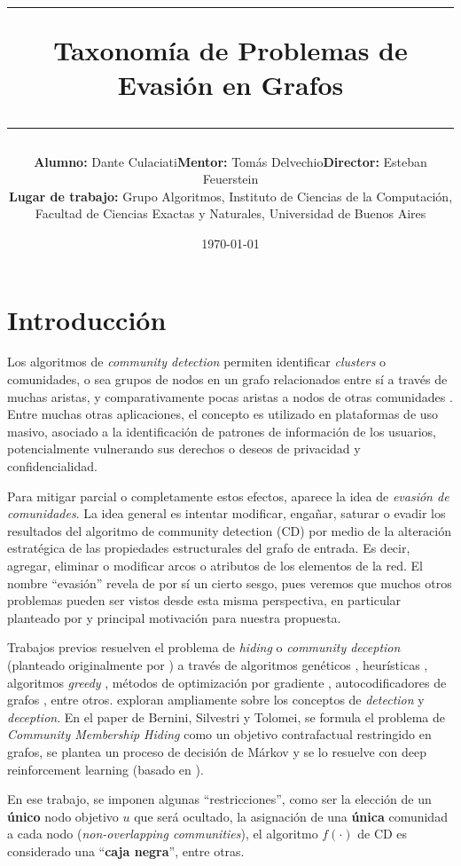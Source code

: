 \documentclass[11pt,a4paper]{article}
\title{
    \vspace{-1.5cm} %
    \hrule
    \vspace{0.05cm}
    \textbf{Taxonomía de Problemas de Evasión en Grafos}
    \vspace{0.2cm}
    \hrule
    \vspace{-0.5cm}
}
\author{
    \begin{tabular}{lll}
        \textbf{Alumno:} Dante Culaciati & \textbf{Mentor:} Tomás Delvechio & \textbf{Director:} Esteban Feuerstein \\[0.1cm]
        \multicolumn{3}{l}{\textbf{Lugar de trabajo:} Grupo Algoritmos, Instituto de Ciencias de la Computación,}\\
        \multicolumn{3}{l}{Facultad de Ciencias Exactas y Naturales, Universidad de Buenos Aires}
    \end{tabular}
}
\date{\vspace{-0.2cm} \today} %
\begin{document}
\maketitle
\vspace{-1.2cm}

\section*{Introducción}
Los algoritmos de \textit{community detection} permiten identificar  \textit{clusters} o comunidades, o sea grupos de nodos en un grafo relacionados entre sí  a través de muchas aristas, y comparativamente pocas aristas a nodos de otras comunidades \cite{Fortunato-2010}. 
Entre muchas otras aplicaciones, el concepto es utilizado en plataformas de uso masivo, asociado a la identificación de patrones de información de los usuarios, potencialmente vulnerando sus derechos o deseos de privacidad y confidencialidad.

Para mitigar parcial o completamente estos efectos, aparece la idea de \textit{evasión de comunidades}.
La idea general es intentar modificar, engañar, saturar o evadir los resultados del algoritmo de community detection (CD) por medio de la alteración estratégica de las propiedades estructurales del grafo de entrada. Es decir, agregar, eliminar o modificar arcos o atributos de los elementos de la red. 
El nombre ``evasión'' revela de por sí un cierto sesgo, pues veremos que muchos otros problemas pueden ser vistos desde esta misma perspectiva,
en particular \textbf{\emph{}} planteado por \textcite{bernini-2024} y principal motivación para nuestra propuesta.

Trabajos previos resuelven el problema de \textit{hiding} o \textit{community deception} (planteado originalmente por \textcite{8118127}) a través de algoritmos genéticos \cite{LIU2022123}, heurísticas \cite{Waniek_2018},
algoritmos \textit{greedy} \cite{9377481}, métodos de optimización por gradiente \cite{silvestri2025communitymembershiphidinggradientbased}, autocodificadores de grafos \cite{LIU2022109495}, entre otros. \textcite{Su_2024} exploran ampliamente sobre los conceptos de \textit{detection} y \textit{deception}.
En el paper de Bernini, Silvestri y Tolomei, se formula el problema de \textit{Community Membership Hiding} como un objetivo contrafactual
restringido en grafos, se plantea un proceso de decisión de Márkov y se lo resuelve con deep reinforcement learning (basado en \cite{Chen_2022}).

En ese trabajo, se imponen algunas ``restricciones'', como ser la elección de un \textbf{único} nodo objetivo $u$ que será ocultado, la asignación de una  \textbf{única} comunidad a cada nodo (\textit{non-overlapping communities}), el algoritmo $f(\cdot)$ de CD es considerado una ``\textbf{caja negra}'', entre otras.
\end{document}
